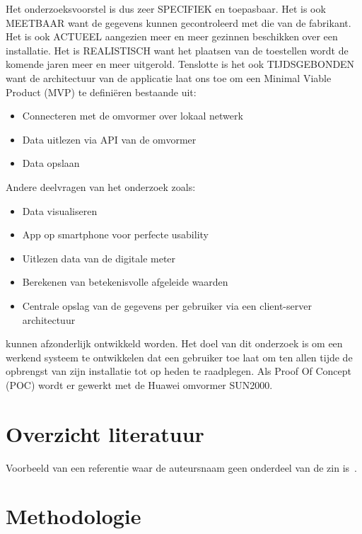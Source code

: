 \documentclass{hogent-article}
\begin{document}
Het onderzoeksvoorstel is dus zeer SPECIFIEK en toepasbaar. Het is ook MEETBAAR want de gegevens kunnen gecontroleerd met die van de fabrikant. Het is ook ACTUEEL aangezien meer en meer gezinnen beschikken over een installatie. Het is REALISTISCH want het plaatsen van de toestellen wordt de komende jaren meer en meer uitgerold. Tenslotte is het ook TIJDSGEBONDEN want de architectuur van de applicatie laat ons toe om een Minimal Viable Product (MVP) te definiëren bestaande uit:
\begin{itemize}
    \item Connecteren met de omvormer over lokaal netwerk
    \item Data uitlezen via API van de omvormer
    \item Data opslaan
\end{itemize}
Andere deelvragen van het onderzoek zoals:
\begin{itemize}
    \item Data visualiseren
    \item App op smartphone voor perfecte usability
    \item Uitlezen data van de digitale meter
    \item Berekenen van betekenisvolle afgeleide waarden
    \item Centrale opslag van de gegevens per gebruiker via een client-server architectuur
\end{itemize}
kunnen afzonderlijk ontwikkeld worden.
Het doel van dit onderzoek is om een werkend systeem te ontwikkelen dat een gebruiker toe laat om ten allen tijde de opbrengst van zijn installatie tot op heden te raadplegen. Als Proof Of Concept (POC) wordt er gewerkt met de Huawei omvormer SUN2000.
\lipsum[1-3]

\section{Overzicht literatuur}


Voorbeeld van een referentie waar de auteursnaam geen onderdeel van de zin is~\autocite{Moore2002}.

\lipsum[4-9]

\section{Methodologie}
\end{document}
